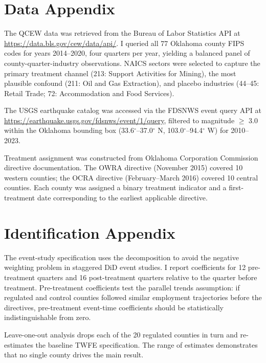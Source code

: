 \documentclass[12pt]{article}
\begin{document}
\label{apep_main_text_end}
\newpage


\newpage
\appendix

\section{Data Appendix}

The QCEW data was retrieved from the Bureau of Labor Statistics API at \url{https://data.bls.gov/cew/data/api/}. I queried all 77 Oklahoma county FIPS codes for years 2014--2020, four quarters per year, yielding a balanced panel of county-quarter-industry observations. NAICS sectors were selected to capture the primary treatment channel (213: Support Activities for Mining), the most plausible confound (211: Oil and Gas Extraction), and placebo industries (44--45: Retail Trade; 72: Accommodation and Food Services).

The USGS earthquake catalog was accessed via the FDSNWS event query API at \url{https://earthquake.usgs.gov/fdsnws/event/1/query}, filtered to magnitude $\geq$ 3.0 within the Oklahoma bounding box (33.6$^\circ$--37.0$^\circ$ N, 103.0$^\circ$--94.4$^\circ$ W) for 2010--2023.

Treatment assignment was constructed from Oklahoma Corporation Commission directive documentation. The OWRA directive (November 2015) covered 10 western counties; the OCRA directive (February--March 2016) covered 10 central counties. Each county was assigned a binary treatment indicator and a first-treatment date corresponding to the earliest applicable directive.

\section{Identification Appendix}

The event-study specification uses the \citet{sunab2021} decomposition to avoid the negative weighting problem in staggered DiD event studies. I report coefficients for 12 pre-treatment quarters and 16 post-treatment quarters relative to the quarter before treatment. Pre-treatment coefficients test the parallel trends assumption: if regulated and control counties followed similar employment trajectories before the directives, pre-treatment event-time coefficients should be statistically indistinguishable from zero.

Leave-one-out analysis drops each of the 20 regulated counties in turn and re-estimates the baseline TWFE specification. The range of estimates demonstrates that no single county drives the main result.
\end{document}
